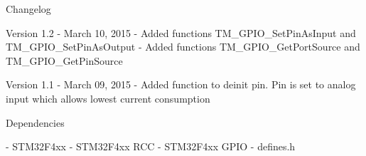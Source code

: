 \begin{DoxyParagraph}{Changelog}

\end{DoxyParagraph}
\begin{DoxyVerb}  Version 1.2
    - March 10, 2015
    - Added functions TM_GPIO_SetPinAsInput and TM_GPIO_SetPinAsOutput
    - Added functions TM_GPIO_GetPortSource and TM_GPIO_GetPinSource

  Version 1.1
    - March 09, 2015
    - Added function to deinit pin. Pin is set to analog input which allows lowest current consumption
\end{DoxyVerb}


\begin{DoxyParagraph}{Dependencies}

\end{DoxyParagraph}
\begin{DoxyVerb} - STM32F4xx
 - STM32F4xx RCC
 - STM32F4xx GPIO
 - defines.h
\end{DoxyVerb}
 